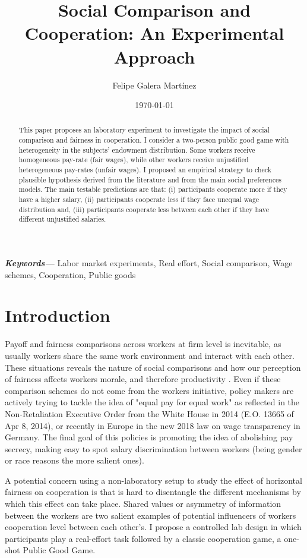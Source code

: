 \documentclass[a4paper, 12pt]{article}
\title{Social Comparison and Cooperation: An Experimental Approach}
\author{Felipe Galera Mart\'inez}
\date{\today}
\providecommand{\keywords}[1]{\textbf{\textit{Keywords---}}#1} %
\begin{document}
\maketitle
\thispagestyle{empty}
\begin{abstract}
This paper proposes an laboratory experiment to investigate the impact of social comparison and fairness in cooperation. I consider a two-person public good game with heterogeneity in the subjects' endowment distribution. Some workers receive homogeneous pay-rate (fair wages), while other workers receive unjustified heterogeneous pay-rates (unfair wages). I proposed an empirical strategy to check plausible hypothesis derived from the literature and from the main social preferences models. The main testable predictions are that: (i) participants cooperate more if they have a higher salary, (ii) participants cooperate less if they face unequal wage distribution and, (iii) participants cooperate less between each other if they have different unjustified salaries. 


\end{abstract}
\keywords{ Labor market experiments, Real effort, Social comparison, Wage schemes, Cooperation, Public goods}

\newpage
\tableofcontents
\thispagestyle{empty}
\newpage

\setcounter{page}{1}
\section{Introduction}

Payoff and fairness comparisons across workers at firm level is inevitable, as usually workers share the same work environment and interact with each other. These situations reveals the nature of social comparisons and how our perception of fairness affects workers morale, and therefore productivity \citep{Loewenstein2000, NBERw18687}. Even if these comparison schemes do not come from the workers initiative, policy makers are actively trying to tackle the idea of "equal pay for equal work" as reflected in the Non-Retaliation Executive Order from the White House in 2014 (E.O. 13665 of Apr 8, 2014), or recently in Europe in the new 2018 law on wage transparency in Germany. The final goal of this policies is promoting the idea of abolishing pay secrecy, making easy to spot salary discrimination between workers (being gender or race reasons the more salient ones).

A potential concern using a non-laboratory setup to study the effect of horizontal fairness on cooperation is that is hard to disentangle the different mechanisms by which this effect can take place. Shared values \citep{Ostrom2000} or asymmetry of information between the workers \citep{Cardenas2003} are two salient examples of potential influencers of workers cooperation level between each other’s. I propose a controlled lab design in which participants play a real-effort task followed by a classic cooperation game, a one-shot Public Good Game.
\end{document}
